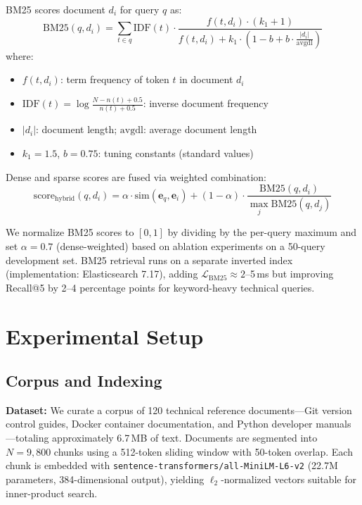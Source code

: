 \documentclass[conference]{IEEEtran}
\begin{document}
BM25 scores document $d_i$ for query $q$ as:
\begin{equation}
\mathrm{BM25}(q, d_i) = \sum_{t \in q} \mathrm{IDF}(t) \cdot \frac{f(t, d_i) \cdot (k_1 + 1)}{f(t, d_i) + k_1 \cdot \left(1 - b + b \cdot \frac{|d_i|}{\mathrm{avgdl}}\right)}
\label{eq:bm25}
\end{equation}
where:
\begin{itemize}
    \item $f(t, d_i)$: term frequency of token $t$ in document $d_i$
    \item $\mathrm{IDF}(t) = \log\frac{N - n(t) + 0.5}{n(t) + 0.5}$: inverse document frequency
    \item $|d_i|$: document length; $\mathrm{avgdl}$: average document length
    \item $k_1{=}1.5$, $b{=}0.75$: tuning constants (standard values)
\end{itemize}

Dense and sparse scores are fused via weighted combination:
\begin{equation}
\mathrm{score}_{\mathrm{hybrid}}(q, d_i) = \alpha \cdot \mathrm{sim}(\mathbf{e}_q, \mathbf{e}_i) + (1-\alpha) \cdot \frac{\mathrm{BM25}(q, d_i)}{\max_{j} \mathrm{BM25}(q, d_j)}
\label{eq:hybrid}
\end{equation}

We normalize BM25 scores to $[0,1]$ by dividing by the per-query maximum and set $\alpha{=}0.7$ (dense-weighted) based on ablation experiments on a 50-query development set. BM25 retrieval runs on a separate inverted index (implementation: Elasticsearch 7.17), adding $\mathcal{L}_{\mathrm{BM25}} \approx 2$--5\,ms but improving Recall@5 by 2--4 percentage points for keyword-heavy technical queries.

\section{Experimental Setup}

\subsection{Corpus and Indexing}

\textbf{Dataset:} We curate a corpus of 120 technical reference documents—Git version control guides, Docker container documentation, and Python developer manuals—totaling approximately 6.7\,MB of text. Documents are segmented into $N{=}9{,}800$ chunks using a 512-token sliding window with 50-token overlap. Each chunk is embedded with \texttt{sentence-transformers/all-MiniLM-L6-v2} (22.7M parameters, 384-dimensional output), yielding $\ell_2$-normalized vectors suitable for inner-product search.
\end{document}
